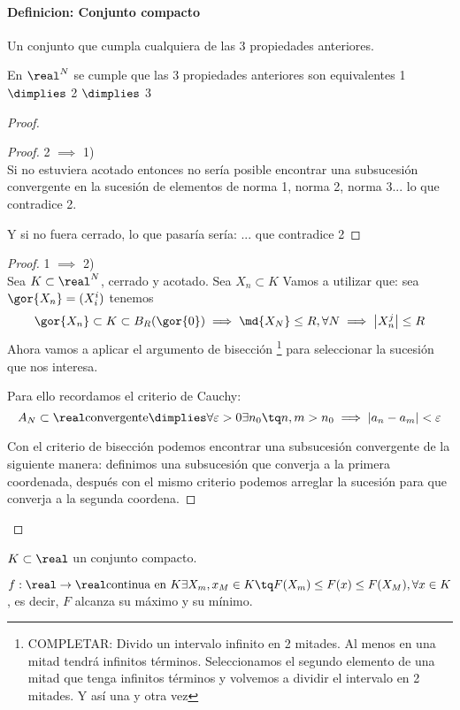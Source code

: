 \documentclass[a4paper,10pt]{apuntes}
\newcommand{\definition}[1]{\paragraph{Definicion: #1\\}}
\begin{document}
\definition{Conjunto compacto}
Un conjunto que cumpla cualquiera de las 3 propiedades anteriores.
\begin{theorem}
 En $\real^N$ se cumple que las 3 propiedades anteriores son equivalentes 1 $\dimplies$ 2 $\dimplies$ 3
\end{theorem}
\begin{proof}
\begin{proof}
 2 $\implies$ 1)\\
 Si no estuviera acotado entonces no sería posible encontrar una subsucesión convergente en la sucesión de elementos de norma 1, norma 2, norma 3... lo que contradice 2.
 
 Y si no fuera cerrado, lo que pasaría sería: ... que contradice 2
 \end{proof}
 \begin{proof}
 1 $\implies$ 2)\\
 Sea $K \subset \real^N$, cerrado y acotado. Sea ${X_n}\subset K$
 Vamos a utilizar que: sea $\gor{X_n} = (X_i^i)$ tenemos
 $$\gor{X_n}\subset K \subset B_R(\gor{0}) \implies \md{X_N} \leq R, \forall N \implies \left|X_n^j\right| \leq R$$
 Ahora vamos a aplicar el argumento de bisección \footnote{COMPLETAR: Divido un intervalo infinito en 2 mitades. Al menos en una mitad tendrá infinitos términos. Seleccionamos el segundo elemento de una mitad que tenga infinitos términos y volvemos a dividir el intervalo en 2 mitades. Y así una y otra vez} para seleccionar la sucesión que nos interesa.
 
 Para ello recordamos el criterio de Cauchy:
 $${A_N} \subset \real \text{convergente} \dimplies \forall \varepsilon > 0 \exists n_0 \tq n,m>n_0 \implies |a_n - a_m| < \varepsilon$$
 
 Con el criterio de bisección podemos encontrar una subsucesión convergente de la siguiente manera: definimos una subsucesión que converja a la primera coordenada, después con el mismo criterio podemos arreglar la sucesión para que converja a la segunda coordena.

 \end{proof}
 
\end{proof}
\begin{theorem}
 $K\subset \real$ un conjunto compacto.
 
 $f:\real \rightarrow \real \text{continua en }K \exists X_m,x_M \in K \tq F(X_m) \leq F(x) \leq F(X_M), \forall x \in K$, es decir, $F$ alcanza su máximo y su mínimo.
\end{theorem}
\end{document}

